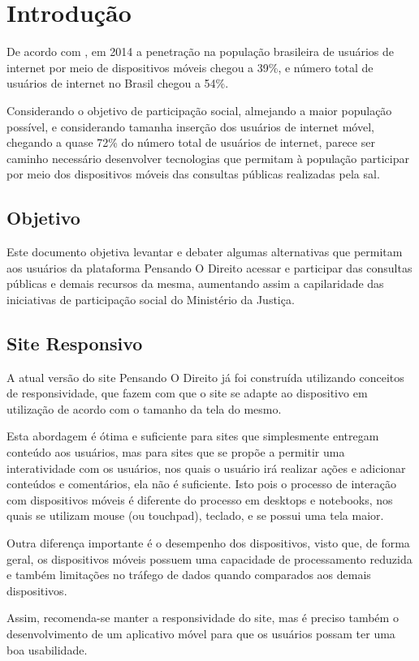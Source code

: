 \chapter{Introdução}
De acordo com , em 2014 a penetração na população brasileira de usuários de internet por meio de dispositivos móveis chegou a 39\%, e número total de usuários de internet no Brasil chegou a 54\%.

Considerando o objetivo de participação social, almejando a maior população possível, e considerando tamanha inserção dos usuários de internet móvel, chegando a quase 72\% do número total de usuários de internet, parece ser caminho necessário desenvolver tecnologias que permitam à população participar por meio dos dispositivos móveis das consultas públicas realizadas pela \gls{sal}.

\section{Objetivo}
Este documento objetiva levantar e debater algumas alternativas que permitam aos usuários da plataforma Pensando O Direito acessar e participar das consultas públicas e demais recursos da mesma, aumentando assim a capilaridade das iniciativas de participação social do Ministério da Justiça.

\section{Site Responsivo}
A atual versão do site Pensando O Direito já foi construída utilizando conceitos de responsividade, que fazem com que o site se adapte ao dispositivo em utilização de acordo com o tamanho da tela do mesmo.

Esta abordagem é ótima e suficiente para sites que simplesmente entregam conteúdo aos usuários, mas para sites que se propõe a permitir uma interatividade com os usuários, nos quais o usuário irá realizar ações e adicionar conteúdos e comentários, ela não é suficiente. Isto pois o processo de interação com dispositivos móveis é diferente do processo em desktops e notebooks, nos quais se utilizam mouse (ou touchpad), teclado, e se possui uma tela maior.

Outra diferença importante é o desempenho dos dispositivos, visto que, de forma geral, os dispositivos móveis possuem uma capacidade de processamento reduzida e também limitações no tráfego de dados quando comparados aos demais dispositivos.

Assim, recomenda-se manter a responsividade do site, mas é preciso também o desenvolvimento de um aplicativo móvel para que os usuários possam ter uma boa usabilidade.